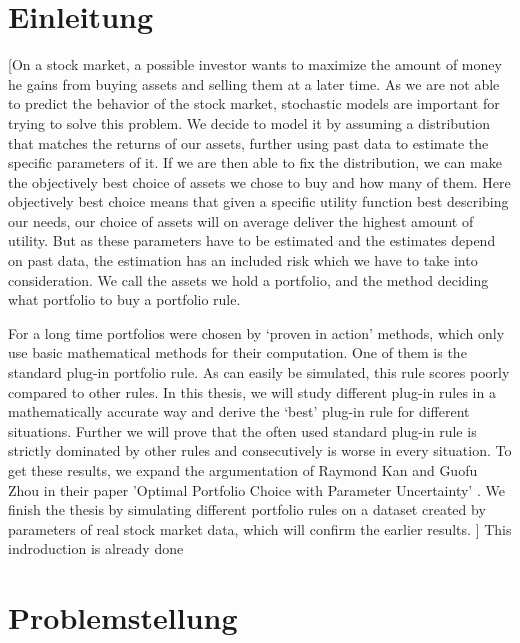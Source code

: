 \documentclass[]{scrartcl}
\begin{document}
	
	\thispagestyle{empty}
	\pagestyle{empty}
	\newpage
	\tableofcontents
	\newpage
	\pagestyle{plain}
	

\section{Einleitung}

	[On a stock market, a possible investor wants to maximize the amount of money he gains from buying assets and selling them at a later time. As we are not able to predict the behavior of the stock market, stochastic models are important for trying to solve this problem. We decide to model it by assuming a distribution that matches the returns of our assets, further using past data to estimate the specific parameters of it. If we are then able to fix the distribution, we can make the objectively best choice of assets we chose to buy and how many of them. Here objectively best choice means that given a specific utility function best describing our needs, our choice of assets will on average deliver the highest amount of utility. But as these parameters have to be estimated and the estimates depend on past data, the estimation has an included risk which we have to take into consideration. We call the  assets we hold a portfolio, and the method deciding what portfolio to buy a portfolio rule.
	
	For a long time portfolios were chosen by `proven in action' methods, which only use basic mathematical methods for their computation. One of them is the standard plug-in portfolio rule. As can easily be simulated, this rule scores poorly compared to other rules. In this thesis, we will study different plug-in rules in a mathematically accurate way and derive the `best' plug-in rule for different situations. Further we will prove that the often used standard plug-in rule is strictly dominated by other rules and consecutively is worse in every situation. To get these results, we expand the argumentation of Raymond Kan and Guofu Zhou in their paper 'Optimal Portfolio Choice with Parameter Uncertainty' \cite{kan_and_zhou}. We finish the thesis by simulating different portfolio rules on a dataset created by parameters of real stock market data, which will confirm the earlier results.
	] This indroduction is already done
\clearpage

	
\section{Problemstellung}
\end{document}
